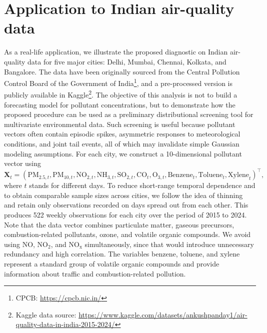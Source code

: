 \documentclass[11pt]{article}
\theoremstyle{plain}
\theoremstyle{definition}
\theoremstyle{remark}
\def\X{\bm{X}}
\begin{document}
\section{Application to Indian air-quality data}\label{sec:real_data}

As a real-life application, we illustrate the proposed diagnostic on Indian air-quality data for five major cities: Delhi, Mumbai, Chennai, Kolkata, and Bangalore. The data have been originally sourced from the Central Pollution Control Board of the Government of India\footnote{CPCB: \url{https://cpcb.nic.in/}}, and a pre-processed version is publicly available in Kaggle\footnote{Kaggle data source: \url{https://www.kaggle.com/datasets/ankushpanday1/air-quality-data-in-india-2015-2024/}}. The objective of this analysis is not to build a forecasting model for pollutant concentrations, but to demonstrate how the proposed procedure can be used as a preliminary distributional screening tool for multivariate environmental data.  Such screening is useful because pollutant vectors often contain episodic spikes, asymmetric responses to meteorological conditions, and joint tail events, all of which may invalidate simple Gaussian modeling assumptions. For each city, we construct a 10-dimensional pollutant vector using
\begin{equation}
        \X_t =
        \left(\mathrm{PM}_{2.5,t},\mathrm{PM}_{10,t},\mathrm{NO}_{2,t},\mathrm{NH}_{3,t},\mathrm{SO}_{2,t},\mathrm{CO}_{t},\mathrm{O}_{3,t},\mathrm{Benzene}_{t}, \mathrm{Toluene}_{t},\mathrm{Xylene}_{t}\right)^\top,
\end{equation}
where $t$ stands for different days. To reduce short-range temporal dependence and to obtain comparable sample sizes across cities, we follow the idea of thinning and retain only observations recorded on days spread out from each other. This produces 522 weekly observations for each city over the period of 2015 to 2024. Note that the data vector combines particulate matter, gaseous precursors, combustion-related pollutants, ozone, and volatile organic compounds.  We avoid using \(\mathrm{NO}\), \(\mathrm{NO}_2\), and \(\mathrm{NO_x}\) simultaneously, since that would introduce unnecessary redundancy and high correlation. The variables benzene, toluene, and xylene represent a standard group of volatile organic compounds and provide information about traffic and combustion-related pollution.
\end{document}
